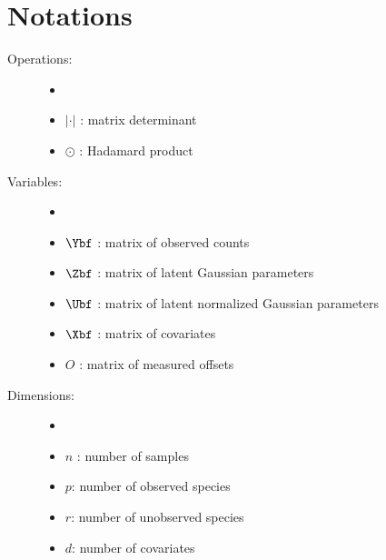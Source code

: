  \section*{Notations}
 
 \begin{description}
 \item[Operations:]  \begin{itemize}
     \item[]
 \item[] $|\cdot|$ : matrix determinant
 \item[] $\odot$ : Hadamard product
 \end{itemize}
 \item[Variables:] \begin{itemize}
     \item[]
 \item[] $\Ybf$ :  matrix  of observed counts
 \item[] $\Zbf$ : matrix of latent Gaussian parameters 
 \item[] $\Ubf$ : matrix of latent normalized Gaussian parameters 
 \item[] $\Xbf$ : matrix of covariates 
 \item[] $O$ : matrix of measured offsets
 \end{itemize}
 \item[Dimensions:]\begin{itemize}
     \item[]
 \item[] $n$ : number of samples
 \item[] $p$: number of observed species
 \item[] $r$: number of unobserved species
 \item[] $d$: number of covariates
 \end{itemize}
 \end{description} 